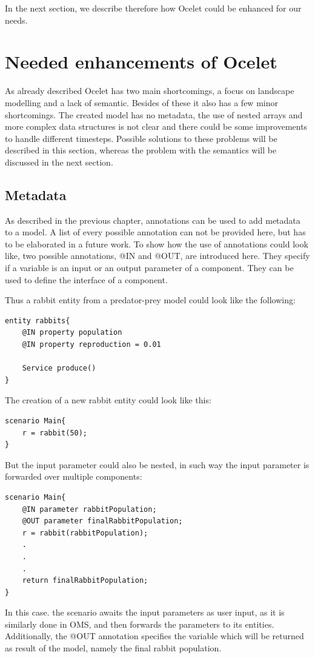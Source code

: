 \par
In the next section, we describe therefore how Ocelet could be enhanced for our needs.

\section{Needed enhancements of Ocelet}
\par
As already described Ocelet has two main shortcomings, a focus on landscape modelling and a lack of semantic. Besides of these it also has a few minor shortcomings. The created model has no metadata, the use of nested arrays and more complex data structures is not clear and there could be some improvements to handle different timesteps. Possible solutions to these problems will be described in this section, whereas the problem with the semantics will be discussed in the next section.
\subsection{Metadata}
\par
As described in the previous chapter, annotations can be used to add metadata to a model. A list of every possible annotation can not be provided here, but has to be elaborated in a future work. To show how the use of annotations could look like, two possible annotations, @IN and @OUT, are introduced here. They specify if a variable is an input or an output parameter of a component. They can be used to define the interface of a component.
\par
Thus a rabbit entity from a predator-prey model could look like the following:
\begin{lstlisting}
entity rabbits{
    @IN property population
    @IN property reproduction = 0.01   

    Service produce()
}
\end{lstlisting}
The creation of a new rabbit entity could look like this:
\begin{lstlisting}
scenario Main{
    r = rabbit(50);
}
\end{lstlisting}
But the input parameter could also be nested, in such way the input parameter is forwarded over multiple components:
\begin{lstlisting}
scenario Main{
    @IN parameter rabbitPopulation;
    @OUT parameter finalRabbitPopulation;
    r = rabbit(rabbitPopulation);
    .
    .
    .
    return finalRabbitPopulation;
}
\end{lstlisting}
\par
In this case. the scenario awaits the input parameters as user input, as it is similarly done in OMS, and then forwards the parameters to its entities. Additionally, the @OUT annotation specifies the variable which will be returned as result of the model, namely the final rabbit population.

